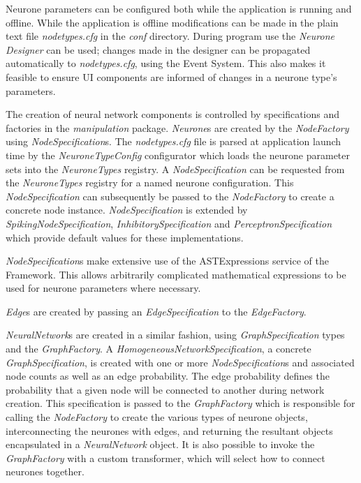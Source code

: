 \documentclass{acm_proc_article-sp}
\begin{document}
{Neurone parameters can be configured both while the application is running and offline. While the application is offline modifications can be made in the plain text file {\textit{nodetypes.cfg}} in the {\textit{conf}} directory. During program use the {\textit{Neurone Designer}} can be used; changes made in the designer can be propagated automatically to {\textit{nodetypes.cfg}}, using the Event System. This also makes it feasible to ensure UI components are informed of changes in a neurone type's parameters.

The creation of neural network components is controlled by specifications and factories in the {\textit{manipulation}} package. {\textit{Neurone}}s are created by the {\textit{NodeFactory}} using {\textit{NodeSpecification}}s. The {\textit{nodetypes.cfg}} file is parsed at application launch time by the {\textit{NeuroneTypeConfig}} configurator which loads the neurone parameter sets into the {\textit{NeuroneTypes}} registry. A {\textit{NodeSpecification}} can be requested from the {\textit{NeuroneTypes}} registry for a named neurone configuration. This {\textit{NodeSpecification}} can subsequently be passed to the {\textit{NodeFactory}} to create a concrete node instance. {\textit{NodeSpecification}} is extended by {\textit{SpikingNodeSpecification}}, {\textit{InhibitorySpecification}} and {\textit{PerceptronSpecification}} which provide default values for these implementations. 

{\textit{NodeSpecification}}s make extensive use of the ASTExpressions service of the Framework. This allows arbitrarily complicated mathematical expressions to be used for neurone parameters where necessary.

{\textit{Edge}}s are created by passing an {\textit{EdgeSpecification}} to the {\textit{EdgeFactory}}.

{\textit{NeuralNetwork}}s are created in a similar fashion, using {\textit{GraphSpecification}} types and the {\textit{GraphFactory}}. A {\textit{HomogeneousNetworkSpecification}}, a concrete {\textit{GraphSpecification}}, is created with one or more {\textit{NodeSpecification}}s and associated node counts as well as an edge probability. The edge probability defines the probability that a given node will be connected to another during network creation. This specification is passed to the {\textit{GraphFactory}} which is responsible for calling the {\textit{NodeFactory}} to create the various types of neurone objects, interconnecting the neurones with edges, and returning the resultant objects encapsulated in a {\textit{NeuralNetwork}} object. It is also possible to invoke the {\textit{GraphFactory}} with a custom transformer, which will select how to connect neurones together.

}
\end{document}

